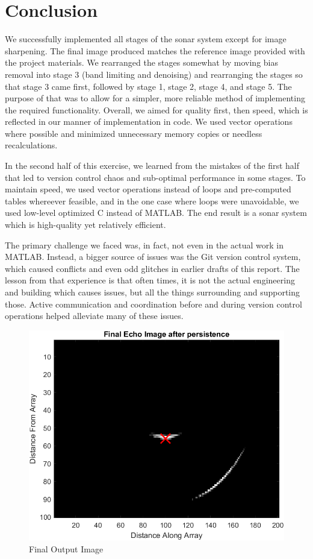 
\section{Conclusion}
We successfully implemented all stages of the sonar system except for image sharpening. The final image produced 
matches the reference image provided with the project materials. We rearranged the stages somewhat by moving bias 
removal into stage 3 (band limiting and denoising) and rearranging the stages so that stage 3 came first, followed 
by stage 1, stage 2, stage 4, and stage 5. The purpose of that was to allow for a simpler, more reliable method
of implementing the required functionality. Overall, we aimed for quality first, then speed, which is reflected
in our manner of implementation in code. We used vector operations where possible and minimized unnecessary
memory copies or needless recalculations.

In the second half of this exercise, we learned from the mistakes of the first half that led to version control 
chaos and sub-optimal performance in some stages. To maintain speed, we used vector operations instead of loops 
and pre-computed tables whereever feasible, and in the one case where loops were unavoidable, we used low-level 
optimized C instead of MATLAB. The end result is a sonar system which is high-quality yet relatively efficient.

The primary challenge we faced was, in fact, not even in the actual work in \textsc{MATLAB}. Instead, a bigger source
of issues was the Git version control system, which caused conflicts and even odd glitches in earlier drafts of this 
report. The lesson from that experience is that often times, it is not the actual engineering and building which causes 
issues, but all the things surrounding and supporting those. Active communication and coordination before and during 
version control operations helped alleviate many of these issues.

\begin{figure}[H]
    \centering
    \includegraphics[width=0.5\linewidth]{figures/finalImage.png}
    \caption{Final Output Image}
    \label{fig:final_image}
\end{figure}

